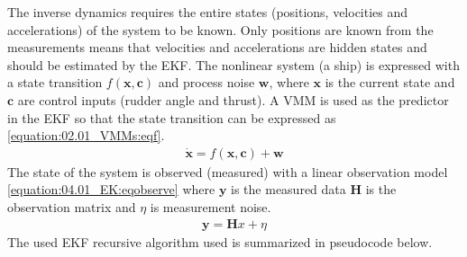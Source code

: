 \documentclass[review]{elsarticle}
\begin{document}
\sphinxAtStartPar
The inverse dynamics requires the entire states (positions, velocities and accelerations) of the system to be known. Only positions are known from the measurements means that velocities and accelerations are hidden states and should be estimated by the EKF.
The nonlinear system (a ship) is expressed with a state transition \(f(\mathbf{x},\mathbf{c})\) and process noise \(\mathbf{w}\), where \(\mathbf{x}\) is the current state and \(\mathbf{c}\) are control inputs (rudder angle and thrust). A VMM is used as the predictor in the EKF so that the state transition can be expressed as \autoref{equation:02.01_VMMs:eqf}.
\begin{equation}\label{equation:04.01_EK:eqnonlinearsystem}
\begin{split}\dot{\mathbf{x}} = f(\mathbf{x},\mathbf{c}) + \mathbf{w}\end{split}
\end{equation}
\sphinxAtStartPar
The state of the system is observed (measured) with a linear observation model \autoref{equation:04.01_EK:eqobserve} where \(\mathbf{y}\) is the measured data \(\mathbf{H}\) is the observation matrix and \(\eta\) is measurement noise.
\begin{equation}\label{equation:04.01_EK:eqobserve}
\begin{split}\mathbf{y} = \mathbf{H} x + \eta\end{split}
\end{equation}
\sphinxAtStartPar
The used EKF recursive algorithm used is summarized in pseudocode below.
\label{04.01_EK:ek-algorithm}
\end{document}
